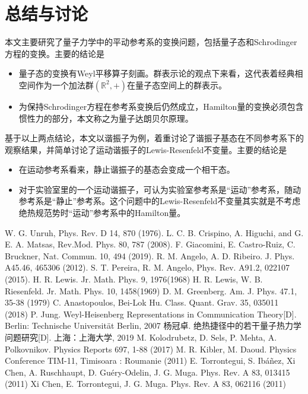\documentclass[a4paper]{article}
\begin{document}
    \section{总结与讨论}

        本文主要研究了量子力学中的平动参考系的变换问题，包括量子态和Schrodinger方程的变换。主要的结论是

        \begin{itemize}
            \item 量子态的变换有Weyl平移算子刻画。群表示论的观点下来看，这代表着经典相空间作为一个加法群$(\mathbb{R}^2,+)$在量子态空间上的群表示。
            \item 为保持Schrodinger方程在参考系变换后仍然成立，Hamilton量的变换必须包含惯性力的部分，本文称之为量子达朗贝尔原理。
        \end{itemize}

        基于以上两点结论，本文以谐振子为例，着重讨论了谐振子基态在不同参考系下的观察结果，并简单讨论了运动谐振子的Lewis-Resenfeld不变量。主要的结论是

        \begin{itemize}
            \item 在运动参考系看来，静止谐振子的基态会变成一个相干态。
            \item 对于实验室里的一个运动谐振子，可认为实验室参考系是“运动”参考系，随动参考系是“静止”参考系。这个问题中的Lewis-Resenfeld不变量其实就是不考虑绝热规范势时“运动”参考系中的Hamilton量。
        \end{itemize}


\begin{thebibliography}{9}
     W. G. Unruh, Phys. Rev. D 14, 870 (1976).
     L. C. B. Crispino, A. Higuchi, and G. E. A. Matsas, Rev.Mod. Phys. 80, 787 (2008).
     F. Giacomini, E. Castro-Ruiz, C. Bruckner, Nat. Commun. 10, 494 (2019).
     R. M. Angelo, A. D. Ribeiro. J. Phys. A45.46, 465306 (2012).
     S. T. Pereira, R. M. Angelo, Phys. Rev. A91.2, 022107 (2015).
     H. R. Lewis. Jr. Math. Phys. 9, 1976(1968)
     H. R. Lewis, W. B. Riesenfeld. Jr. Math. Phys. 10, 1458(1969)
     D. M. Greenberg. Am. J. Phys. 47.1, 35-38 (1979)
     C. Anastopoulos, Bei-Lok Hu. Class. Quant. Grav. 35, 035011 (2018)
     P. Jung.  Weyl-Heisenberg Representations in Communication Theory[D]. Berlin: Technische Universität Berlin, 2007
     杨冠卓. 绝热捷径中的若干量子热力学问题研究[D]. 上海：上海大学, 2019
     M. Kolodrubetz, D. Sels, P. Mehta, A. Polkovnikov. Physics Reports 697, 1-88 (2017)
     M. R. Kibler, M. Daoud. Physics Conference TIM-11, Timisoara : Roumanie (2011)
     E. Torrontegui, S. Ibáñez, Xi Chen, A. Ruschhaupt, D. Guéry-Odelin, J. G. Muga. Phys. Rev. A 83, 013415 (2011)
     Xi Chen, E. Torrontegui, J. G. Muga. Phys. Rev. A 83, 062116 (2011)
\end{thebibliography}
\end{document}
